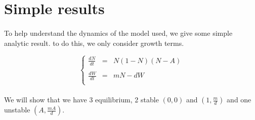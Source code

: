 \documentclass{article}
\begin{document}
\newpage
\section{Simple results}



\paragraph{} %


To help understand the dynamics of the model used, we give some simple analytic result. to do this, we only consider growth terms.

\[ %
\left\lbrace
\begin{array}{rcl}
\frac{dN}{dt} & = & N(1-N)(N-A) \\
\\
\frac{dW}{dt} & = & mN -dW \\
\end{array}
\right.
\]


\paragraph{}
We will show that we have 3 equilibrium, 2 stable $(0, 0)$ and $(1, \frac{m}{d})$ and one unstable $(A, \frac{mA}{d})$.
\end{document}
